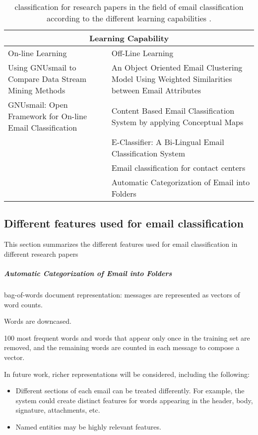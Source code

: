 \begin{center}
\begin{table}
\begin{tabular}{|p{6cm}|p{6cm}|}
\hline
\multicolumn{2}{|c|}{Learning Capability} \\
\hline
On-line Learning & Off-Line Learning 
\\ \hline
Using GNUsmail to Compare Data Stream Mining Methods \cite{JOSE11} &
An Object Oriented Email Clustering Model Using  Weighted Similarities 
between Email Attributes \cite{NARESH10}
\\ \hline

GNUsmail: Open Framework for On-line Email Classification \cite{MANUEL11}
& Content Based Email Classification System by applying Conceptual Maps \cite{BASKARAN09}
\\ \hline

& E-Classifier: A Bi-Lingual Email Classification System \cite{NOUF08}
\\ \hline

& Email classification for contact centers \cite{ANI03}
\\ \hline

& 
Automatic Categorization of Email into Folders \cite{RON04}

\\ \hline

\end{tabular}
\caption{classification for research papers in the field of email classification according to the different learning capabilities .}
\end{table}
\end{center}



\subsection{Different features used for email classification}
This section summarizes the different features used for email classification in different research papers
    \subparagraph{Automatic Categorization of Email into Folders \cite{RON04}}
	\begin{my_itemize}
		\item bag-of-words document representation: messages are represented as vectors of word counts.
		\item Words are downcased.
		\item 100 most frequent words and words that appear only once in the training set are removed, and the remaining words are counted in each message to compose a vector.
		\item In future work, richer representations will be considered, including the following:
			\begin{itemize}
				\item Different sections of each email can be treated differently. For example, the system could create distinct features for words appearing in the header, body, signature, attachments, etc.
				\item Named entities may be highly relevant features.
			\end{itemize}
	\end{my_itemize}

